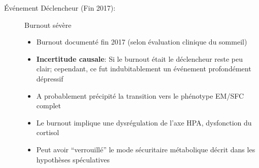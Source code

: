 \begin{description}
    \item[Événement Déclencheur (Fin 2017):] Burnout sévère
    \begin{itemize}
        \item Burnout documenté fin 2017 (selon évaluation clinique du sommeil)
        \item \textbf{Incertitude causale}: Si le burnout était le déclencheur reste peu clair; cependant, ce fut indubitablement un événement profondément dépressif
        \item A probablement précipité la transition vers le phénotype EM/SFC complet
        \item Le burnout implique une dysrégulation de l'axe HPA, dysfonction du cortisol
        \item Peut avoir ``verrouillé'' le mode sécuritaire métabolique décrit dans les hypothèses spéculatives
    \end{itemize}


\end{description}
